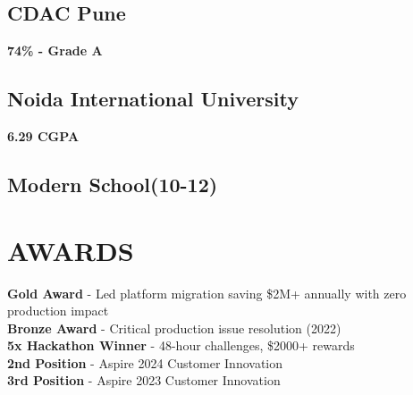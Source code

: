 \begin{minipage}[t]{0.33\textwidth}
\subsection{CDAC Pune}
\textbf{74\% - Grade A}
\vspace{\topsep}

\subsection{Noida International University}
\textbf{6.29 CGPA}
\vspace{\topsep}

\subsection{Modern School(10-12)}
\sectionsep

\section{AWARDS}
\sectionsep
\textbullet{} {\textbf{Gold Award} - Led platform migration saving \$2M+ annually with zero production impact} \\
\textbullet{} {\textbf{Bronze Award} - Critical production issue resolution (2022)} \\
\textbullet{} {\textbf{5x Hackathon Winner} - 48-hour challenges, \$2000+ rewards} \\
\textbullet{} \textbf{2nd Position} - Aspire 2024 Customer Innovation \\
\textbullet{} \textbf{3rd Position} - Aspire 2023 Customer Innovation \\

\sectionsep

\end{minipage}%


\documentclass[]{article}